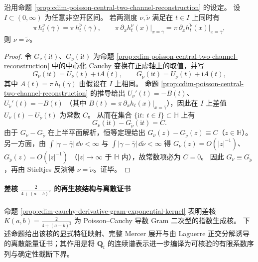 \begin{corollary}\label{cor:cdim-poisson-central-two-channel-local-uniqueness}
沿用命题 \ref{prop:cdim-poisson-central-two-channel-reconstruction} 的设定。
设 \(I\subset(0,\infty)\) 为任意非空开区间。
若两测度 \(\nu,\widetilde\nu\) 满足在 \(t\in I\) 上同时有
\[
\pi\,h_t^{\nu}(\bar\gamma)=\pi\,h_t^{\widetilde\nu}(\bar\gamma),
\qquad
\pi\,\partial_x h_t^{\nu}(x)\big|_{x=\bar\gamma}
=\pi\,\partial_x h_t^{\widetilde\nu}(x)\big|_{x=\bar\gamma},
\]
则 \(\nu=\widetilde\nu\)。
\end{corollary}
\begin{proof}
令 \(G_{\nu}(\mathrm{i}t)\)、\(G_{\widetilde\nu}(\mathrm{i}t)\) 为命题 \ref{prop:cdim-poisson-central-two-channel-reconstruction} 中的中心化 Cauchy 变换在正虚轴上的取值，并写
\[
G_{\nu}(\mathrm{i}t)=U_{\nu}(t)+\mathrm{i}A(t),
\qquad
G_{\widetilde\nu}(\mathrm{i}t)=U_{\widetilde\nu}(t)+\mathrm{i}A(t),
\]
其中 \(A(t)=\pi\,h_t(\bar\gamma)\) 由假设在 \(I\) 上相同。
命题 \ref{prop:cdim-poisson-central-two-channel-reconstruction} 的推导给出
\(
U_{\nu}'(t)=-B(t)
\)、
\(
U_{\widetilde\nu}'(t)=-B(t)
\)
（其中 \(B(t)=\pi\,\partial_x h_t(x)|_{x=\bar\gamma}\)），因此在 \(I\) 上差值 \(U_{\nu}(t)-U_{\widetilde\nu}(t)\) 为常数 \(C\)。
从而在集合 \(\{\mathrm{i}t:\ t\in I\}\subset\mathbb{H}\) 上有
\[
G_{\nu}(\mathrm{i}t)-G_{\widetilde\nu}(\mathrm{i}t)=C.
\]
由于 \(G_{\nu}-G_{\widetilde\nu}\) 在上半平面解析，恒等定理给出 \(G_{\nu}(z)-G_{\widetilde\nu}(z)\equiv C\)（\(z\in\mathbb{H}\)）。
另一方面，由 \(\int|\gamma-\bar\gamma|\,\dd\nu<\infty\) 与 \(\int|\gamma-\bar\gamma|\,\dd\widetilde\nu<\infty\) 得
\(
G_{\nu}(z)=O(|z|^{-1})
\)、
\(
G_{\widetilde\nu}(z)=O(|z|^{-1})
\)
（\(|z|\to\infty\) 于 \(\mathbb{H}\) 内），故常数项必为 \(C=0\)。
因此 \(G_{\nu}\equiv G_{\widetilde\nu}\)，再由 Stieltjes 反演得 \(\nu=\widetilde\nu\)。证毕。
\end{proof}

\paragraph{差核 \texorpdfstring{$\frac{2}{4+(a-b)^2}$}{2/(4+(a-b)^2)} 的再生核结构与离散证书}
命题 \ref{prop:cdim-cauchy-derivative-gram-exponential-kernel} 表明差核
\(
K(a,b)=\frac{2}{4+(a-b)^2}
\)
为 Poisson--Cauchy 导数 Gram 二次型的指数生成核。
下述命题给出该核的显式特征映射、完整 Mercer 展开与由 Laguerre 正交分解诱导的离散能量证书；其作用是将 \(\mathbf Q_t\) 的连续谱表示进一步编译为可核验的有限系数序列与确定性截断下界。

